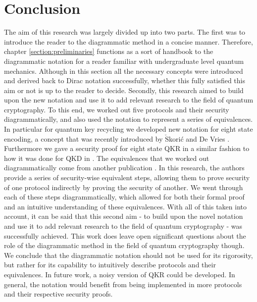 \documentclass[]{article}
\begin{document}
\section{Conclusion}
\label{section:conclusion}
The aim of this research was largely divided up into two parts. The first was to introduce the reader to the diagrammatic method in a concise manner. Therefore, chapter \ref{section:preliminaries} functions as a sort of handbook to the diagrammatic notation for a reader familiar with undergraduate level quantum mechanics. Although in this section all the necessary concepts were introduced and derived back to Dirac notation successfully, whether this fully satisfied this aim or not is up to the reader to decide. Secondly, this research aimed to build upon the new notation and use it to add relevant research to the field of quantum cryptography. To this end, we worked out five protocols and their security diagrammatically, and also used the notation to represent a series of equivalences. In particular for quantum key recycling we developed new notation for eight state encoding, a concept that was recently introduced by $\check{\textrm{S}}$korić and De Vries \cite{DeVries2016}. Furthermore we gave a security proof for eight state QKR in a similar fashion to how it was done for QKD in \cite{Kissinger2017}. The equivalences that we worked out diagrammatically come from another publication \cite{cryptoeprint:2019:875}. In this research, the authors provide a series of security-wise equivalent steps, allowing them to prove security of one protocol indirectly by proving the security of another. We went through each of these steps diagrammatically, which allowed for both their formal proof and an intuitive understanding of these equivalences. With all of this taken into account, it can be said that this second aim - to build upon the novel notation and use it to add relevant research to the field of quantum cryptography - was successfully achieved. This work does leave open significant questions about the role of the diagrammatic method in the field of quantum cryptography though. We conclude that the diagrammatic notation should not be used for its rigorosity, but rather for its capability to intuitively describe protocols and their equivalences. In future work, a noisy version of QKR could be developed. In general, the notation would benefit from being implemented in more protocols and their respective security proofs.

\end{document}
